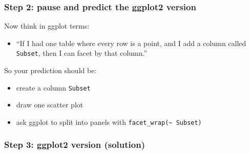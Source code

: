 \documentclass[
  letterpaper,
  DIV=11,
  numbers=noendperiod]{scrartcl}
\providecommand{\tightlist}{%
  \setlength{\itemsep}{0pt}\setlength{\parskip}{0pt}}\usepackage{longtable,booktabs,array}
\begin{document}
\subsubsection{Step 2: pause and predict the ggplot2
version}\label{step-2-pause-and-predict-the-ggplot2-version-3}

Now think in ggplot terms:

\begin{itemize}
\tightlist
\item
  ``If I had one table where every row is a point, and I add a column
  called \texttt{Subset}, then I can facet by that column.''
\end{itemize}

So your prediction should be:

\begin{itemize}
\tightlist
\item
  create a column \texttt{Subset}
\item
  draw one scatter plot
\item
  ask ggplot to split into panels with
  \texttt{facet\_wrap(\textasciitilde{}\ Subset)}
\end{itemize}

\subsubsection{Step 3: ggplot2 version
(solution)}\label{step-3-ggplot2-version-solution-3}
\end{document}
